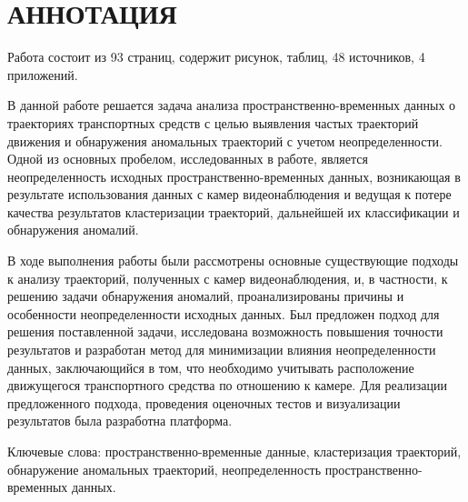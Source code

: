 \chapter*{АННОТАЦИЯ}

Работа состоит из 93 страниц, содержит  рисунок,  таблиц, 48 источников, 4 приложений.

В данной работе решается задача анализа пространственно-временных данных о траекториях транспортных средств с целью выявления частых траекторий движения и обнаружения аномальных траекторий с учетом неопределенности. Одной из основных пробелом, исследованных в работе, является неопределенность исходных пространственно-временных данных, возникающая в результате использования данных с камер видеонаблюдения и ведущая к потере качества результатов кластеризации траекторий, дальнейшей их классификации и обнаружения аномалий. 

В ходе выполнения работы были рассмотрены основные существующие подходы к анализу траекторий, полученных с камер видеонаблюдения, и, в частности, к решению задачи обнаружения аномалий, проанализированы причины и особенности неопределенности исходных данных. Был предложен подход для решения поставленной задачи, исследована возможность повышения точности результатов и разработан метод для минимизации влияния неопределенности данных, заключающийся в том, что необходимо учитывать расположение движущегося транспортного средства по отношению к камере. Для реализации предложенного подхода, проведения оценочных тестов и визуализации результатов была разработна платформа.

\bigbreak
Ключевые слова: пространственно-временные данные, кластеризация траекторий, обнаружение аномальных траекторий, неопределенность пространственно-временных данных.